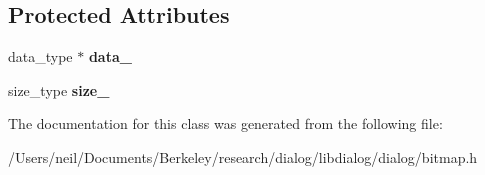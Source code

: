 \subsection*{Protected Attributes}
\begin{DoxyCompactItemize}
\item 
\mbox{\label{classdialog_1_1bitmap_a343e756ef501f484742f1e87a4085074}} 
data\+\_\+type $\ast$ {\bfseries data\+\_\+}
\item 
\mbox{\label{classdialog_1_1bitmap_a85885c54fdd3eec34785d882bc4d3228}} 
size\+\_\+type {\bfseries size\+\_\+}
\end{DoxyCompactItemize}


The documentation for this class was generated from the following file\+:\begin{DoxyCompactItemize}
\item 
/\+Users/neil/\+Documents/\+Berkeley/research/dialog/libdialog/dialog/bitmap.\+h\end{DoxyCompactItemize}
